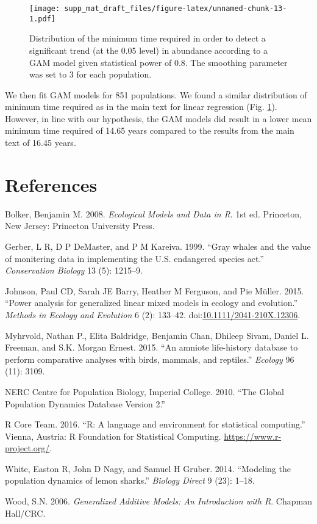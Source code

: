 \documentclass[12pt,]{article}
\begin{document}
\begin{figure}[htbp]
\centering
\texttt{[image: supp\_mat\_draft\_files/figure-latex/unnamed-chunk-13-1.pdf]}
\caption{Distribution of the minimum time required in order to detect a
significant trend (at the 0.05 level) in abundance according to a GAM
model given statistical power of 0.8. The smoothing parameter was set to
3 for each population.\label{fig:min_time_dist_gam}}
\end{figure}

We then fit GAM models for 851 populations. We found a similar
distribution of minimum time required as in the main text for linear
regression (Fig. \ref{fig:min_time_dist_gam}). However, in line with our
hypothesis, the GAM models did result in a lower mean minimum time
required of 14.65 years compared to the results from the main text of
16.45 years.

\clearpage

\section*{References}\label{references}

\hypertarget{refs}{}
\hypertarget{ref-Bolker2008}{}
Bolker, Benjamin M. 2008. \emph{Ecological Models and Data in R}. 1st
ed. Princeton, New Jersey: Princeton University Press.

\hypertarget{ref-Gerber1999}{}
Gerber, L R, D P DeMaster, and P M Kareiva. 1999. ``Gray whales and the
value of monitering data in implementing the U.S. endangered species
act.'' \emph{Conservation Biology} 13 (5): 1215--9.

\hypertarget{ref-Johnson2015}{}
Johnson, Paul CD, Sarah JE Barry, Heather M Ferguson, and Pie Müller.
2015. ``Power analysis for generalized linear mixed models in ecology
and evolution.'' \emph{Methods in Ecology and Evolution} 6 (2): 133--42.
doi:\href{https://doi.org/10.1111/2041-210X.12306}{10.1111/2041-210X.12306}.

\hypertarget{ref-Myhrvold2015}{}
Myhrvold, Nathan P., Elita Baldridge, Benjamin Chan, Dhileep Sivam,
Daniel L. Freeman, and S.K. Morgan Ernest. 2015. ``An amniote
life-history database to perform comparative analyses with birds,
mammals, and reptiles.'' \emph{Ecology} 96 (11): 3109.

\hypertarget{ref-GPDD2010}{}
NERC Centre for Population Biology, Imperial College. 2010. ``The Global
Population Dynamics Database Version 2.''

\hypertarget{ref-RCoreTeam2016}{}
R Core Team. 2016. ``R: A language and environment for statistical
computing.'' Vienna, Austria: R Foundation for Statistical Computing.
\url{https://www.r-project.org/}.

\hypertarget{ref-White2014}{}
White, Easton R, John D Nagy, and Samuel H Gruber. 2014. ``Modeling the
population dynamics of lemon sharks.'' \emph{Biology Direct} 9 (23):
1--18.

\hypertarget{ref-Wood2006}{}
Wood, S.N. 2006. \emph{Generalized Additive Models: An Introduction with
R}. Chapman Hall/CRC.
\end{document}
